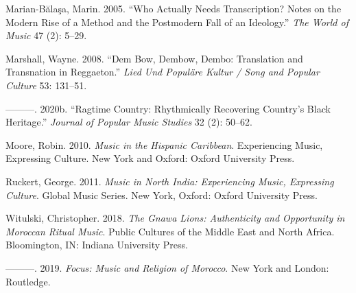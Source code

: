\documentclass[twoside]{article}
\begin{document}
\begin{hangparas}{15pt}{1}
Marian-Bălaşa, Marin. 2005. ``Who Actually Needs Transcription? Notes on
the Modern Rise of a Method and the Postmodern Fall of an Ideology.''
\emph{The World of Music} 47 (2): 5--29.

Marshall, Wayne. 2008. ``Dem Bow, Dembow, Dembo: Translation and
Transnation in Reggaeton.'' \emph{Lied Und Populäre Kultur / Song and
Popular Culture} 53: 131--51.

---------. 2020b. ``Ragtime Country: Rhythmically Recovering Country's
Black Heritage.'' \emph{Journal of Popular Music Studies} 32 (2):
50--62.

Moore, Robin. 2010. \emph{Music in the Hispanic Caribbean}. Experiencing
Music, Expressing Culture. New York and Oxford: Oxford University Press.

Ruckert, George. 2011. \emph{Music in North India: Experiencing Music,
Expressing Culture}. Global Music Series. New York, Oxford: Oxford
University Press.

Witulski, Christopher. 2018. \emph{The Gnawa Lions: Authenticity and
Opportunity in Moroccan Ritual Music}. Public Cultures of the Middle
East and North Africa. Bloomington, IN: Indiana University Press.

---------. 2019. \emph{Focus: Music and Religion of Morocco}. New York
and London: Routledge.

\end{hangparas}
\end{document}
